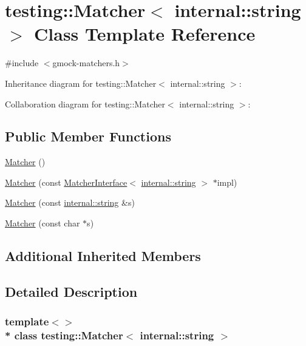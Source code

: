 \hypertarget{classtesting_1_1_matcher_3_01internal_1_1string_01_4}{}\section{testing\+:\+:Matcher$<$ internal\+:\+:string $>$ Class Template Reference}
\label{classtesting_1_1_matcher_3_01internal_1_1string_01_4}


{\ttfamily \#include $<$gmock-\/matchers.\+h$>$}



Inheritance diagram for testing\+:\+:Matcher$<$ internal\+:\+:string $>$\+:


Collaboration diagram for testing\+:\+:Matcher$<$ internal\+:\+:string $>$\+:
\subsection*{Public Member Functions}
\begin{DoxyCompactItemize}
\item 
\hyperlink{classtesting_1_1_matcher_3_01internal_1_1string_01_4_ad0c4da71efc8f5b8a07f279fa2bcb392}{Matcher} ()
\item 
\hyperlink{classtesting_1_1_matcher_3_01internal_1_1string_01_4_a03a7b1b4a93b762685e2f46d6255d493}{Matcher} (const \hyperlink{classtesting_1_1_matcher_interface}{Matcher\+Interface}$<$ \hyperlink{namespacetesting_1_1internal_a8e8ff5b11e64078831112677156cb111}{internal\+::string} $>$ $\ast$impl)
\item 
\hyperlink{classtesting_1_1_matcher_3_01internal_1_1string_01_4_ae2d21038e4dcc25776187d8bff1665f3}{Matcher} (const \hyperlink{namespacetesting_1_1internal_a8e8ff5b11e64078831112677156cb111}{internal\+::string} \&s)
\item 
\hyperlink{classtesting_1_1_matcher_3_01internal_1_1string_01_4_a65f1d7616edb049ac059ad5d3fa2d625}{Matcher} (const char $\ast$s)
\end{DoxyCompactItemize}
\subsection*{Additional Inherited Members}


\subsection{Detailed Description}
\subsubsection*{template$<$$>$\\*
class testing\+::\+Matcher$<$ internal\+::string $>$}



